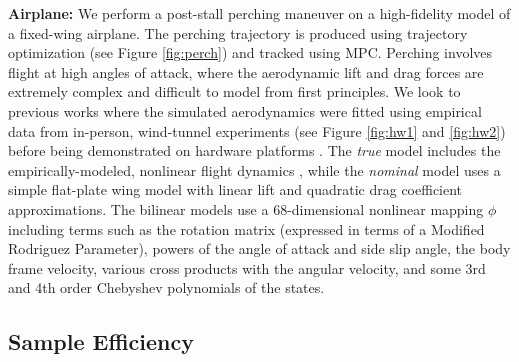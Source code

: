 \documentclass[../root.tex]{subfiles}
\newcommand{\changed}[1]{{\color{black} #1}}
\begin{document}
\textbf{Airplane:} We perform a post-stall perching maneuver on a high-fidelity model of
a fixed-wing airplane. The perching trajectory is produced using trajectory optimization
(see Figure \ref{fig:perch}) and tracked using MPC. \changed{Perching involves flight at high
angles of attack, where the aerodynamic lift and drag forces are extremely complex and
difficult to model from first principles. We look to previous works where the simulated
aerodynamics were fitted using empirical data from in-person, wind-tunnel experiments
(see Figure \ref{fig:hw1} and \ref{fig:hw2}) before being demonstrated on hardware platforms
\cite{moore_Robust_2014,manchester_Variable_2017}.
The \textit{true} model includes the empirically-modeled,
nonlinear flight dynamics \cite{manchester_Variable_2017}, while the \textit{nominal}
model uses a simple flat-plate wing model with linear lift and quadratic drag coefficient
approximations.} The bilinear models use a 68-dimensional nonlinear mapping $\phi$ including
terms such as the rotation matrix (expressed in terms of a Modified Rodriguez Parameter),
powers of the angle of attack and side slip angle, the body frame velocity, various cross
products with the angular velocity, and some 3rd and 4th order Chebyshev polynomials
of the states.


\subsection{Sample Efficiency}
\end{document}
